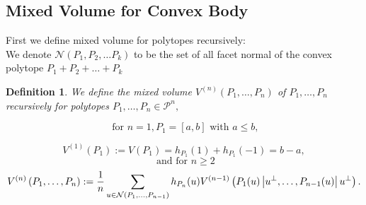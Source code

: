 \documentclass[oneside]{book}
\newtheorem{mydef}{Definition}[section]
\begin{document}
	\subsection{Mixed Volume for Convex Body}
	\label{ss:20.5}
	First we define mixed volume for polytopes recursively:  \\
	We denote  $ \mathcal{N}(P_{1},P_{2},\ldots P_{k})$ to be the set of all facet normal of the convex polytope $P_{1}+P_{2}+ \ldots + P_{k}$
	\begin{mydef} \label{d:18}
		We define the mixed volume $V^{(n)}\left(P_{1}, \ldots, P_{n}\right)$ of $P_{1}, \ldots, P_{n}$ recursively for polytopes $P_{1}, \ldots, P_{n} \in \mathcal{P}^{n},$ 
		
		$$ \text{ for } n = 1, P_{1}=[a, b] \text { with } a \leq b,$$ 
		
		\begin{equation}
		\label{eq49}
		V^{(1)}\left(P_{1}\right):=V\left(P_{1}\right)=h_{P_{1}}(1)+h_{P_{1}}(-1) = b - a,  
		\end{equation} 
		$$\text{ and} \text { for } n \geq 2 $$ 
		\begin{equation} \label{eq50}
		\\
		V^{(n)}\left(P_{1}, \ldots, P_{n}\right):=\frac{1}{n} \sum_{u \in \mathcal{N}\left(P_{1}, \ldots, P_{n-1}\right)} h_{P_{n}}(u) V^{(n-1)}\left(P_{1}(u)\left|u^{\perp}, \ldots, P_{n-1}(u)\right| u^{\perp}\right).
		\end{equation}
	\end{mydef}     
\end{document}

